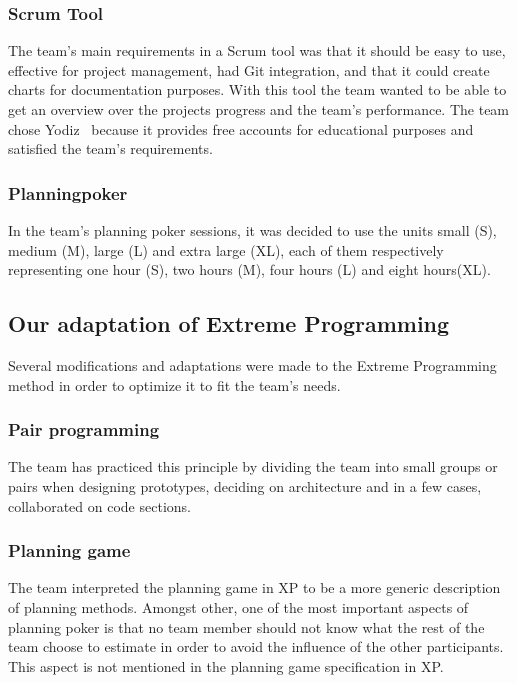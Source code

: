 \subsubsection{Scrum Tool}
The team's main requirements in a Scrum tool was that it should be easy to use, effective for project management, had Git integration, and that it could create charts for documentation purposes. With this tool the team wanted to be able to get an overview over the projects progress and the team's performance. The team chose Yodiz~\cite{yodiz} because it provides free accounts for educational purposes and satisfied the team's requirements.

\subsubsection{Planningpoker}
In the team's planning poker sessions, it was decided to use the units small (S), medium (M), large (L) and extra large (XL), each of them respectively representing one hour (S), two hours (M), four hours (L) and eight hours(XL).

\subsection{Our adaptation of Extreme Programming}
\label{sec:adapExtremeProgr}
Several modifications and adaptations were made to the Extreme Programming method in order to optimize it to fit the team's needs.

\subsubsection{Pair programming}
The team has practiced this principle by dividing the team into small groups or pairs when designing prototypes, deciding on architecture and in a few cases, collaborated on code sections.

\subsubsection{Planning game}
The team interpreted the planning game in XP to be a more generic description of planning methods.  Amongst other, one of the most important aspects of planning poker is that no team member should not know what the rest of the team choose to estimate in order to avoid the influence of the other participants. This aspect is not mentioned in the planning game specification in XP.

